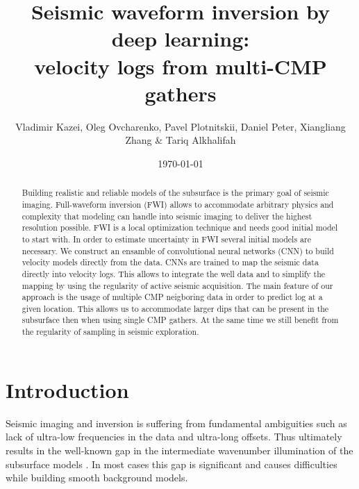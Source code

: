 \documentclass[paper,twocolomn]{geophysics}
\begin{document}
\title{Seismic waveform inversion by deep learning: \\
	 velocity logs from multi-CMP gathers}

\renewcommand{\thefootnote}{\fnsymbol{footnote}} 

\author{Vladimir Kazei\footnotemark[1], Oleg Ovcharenko, Pavel Plotnitskii, Daniel Peter, Xiangliang Zhang \& Tariq Alkhalifah}
\address{
\footnotemark[1] KAUST, Saudi Arabia}
\date{\today}


\maketitle

\begin{abstract}
Building realistic and reliable models of the subsurface is the primary goal of seismic imaging.
%
Full-waveform inversion (FWI) allows to accommodate arbitrary physics and complexity that modeling can handle into seismic imaging to deliver the highest resolution possible.
FWI is a local optimization technique and needs good initial model to start with.
In order to estimate uncertainty in FWI several initial models are necessary.
%
We construct an ensamble of convolutional neural networks (CNN) to build velocity models directly from the data. 
CNNs are trained to map the seismic data directly into velocity logs. This allows to integrate the well data and to simplify the mapping by using the regularity of active seismic acquisition. 
%
The main feature of our approach is the usage of multiple CMP neigboring data in order to predict log at a given location. This allows us to accommodate larger dips that can be present in the subsurface then when using single CMP gathers. At the same time we still benefit from the regularity of sampling in seismic exploration.  
\end{abstract}


\section{Introduction}
Seismic imaging and inversion is suffering from fundamental ambiguities such as lack of ultra-low frequencies in the data and ultra-long offsets. Thus ultimately results in the well-known gap in the intermediate wavenumber illumination of the subsurface models \citep{claerbout1985, mora1989, sirgue2004, alkhalifahFullmodelWavenumberInversion2016, kazei2016, kazei2018, yao2019extraction}. In most cases this gap is significant and causes difficulties while building smooth background models.
\end{document}

